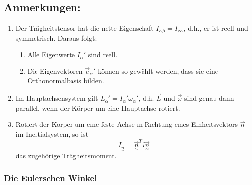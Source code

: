 \documentclass[10pt, letterpaper]{article}
\begin{document}
\subsection*{Anmerkungen:}
\begin{enumerate}
  \item Der Trägheitstensor hat die nette Eigenschaft $I_{\alpha\beta} = I_{\beta\alpha}$, d.h., er ist reell und symmetrisch. Daraus folgt:
  \begin{enumerate}
    \item Alle Eigenwerte $I_\alpha'$ sind reell.
    \item Die Eigenvektoren $\vec{e}_\alpha'$ können so gewählt werden, dass sie eine Orthonormalbasis bilden.
  \end{enumerate}
  
  \item Im Hauptachsensystem gilt $L_\alpha' = I_\alpha'\omega_\alpha'$, d.h. $\vec{L}$ und $\vec{\omega}$ sind genau dann parallel, wenn der Körper um eine Hauptachse rotiert.

  \item Rotiert der Körper um eine feste Achse in Richtung eines Einheitsvektors $\vec{n}$ im Inertialsystem, so ist
  \[
  I_{\underset{\sim}{n}} = \vec{\underset{\sim}{n}}^T I \vec{\underset{\sim}{n}}
  \]
  das zugehörige Trägheitsmoment.
\end{enumerate}







\subsubsection{Die Eulerschen Winkel}
\end{document}
